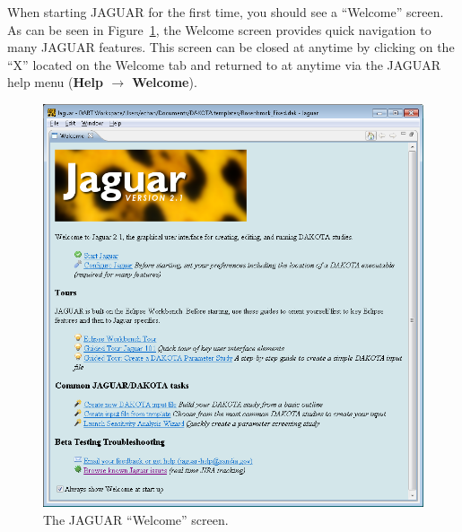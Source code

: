 When starting JAGUAR for the first time, you should see a ``Welcome''
screen.  As can be seen in Figure~\ref{fig:input:jag_welcome}, the
Welcome screen provides quick navigation to many JAGUAR features.
This screen can be closed at anytime by clicking on the ``X'' located
on the Welcome tab and returned to at anytime via the JAGUAR help menu
({\bf Help $\rightarrow$ Welcome}).
\begin{figure}
  \centering
  \includegraphics[scale=0.4]{images/2_1jag_welcome}
  \caption{The JAGUAR ``Welcome'' screen.}
  \label{fig:input:jag_welcome}
\end{figure}

